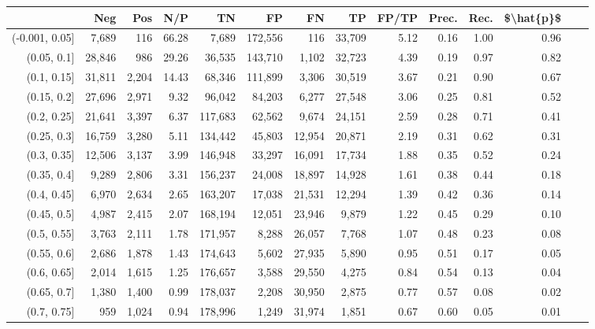 \begin{tabular}{rrrrrrrrrrrrrr}
\toprule
{} &     Neg &    Pos &    N/P &       TN &       FP &      FN &      TP & FP/TP & Prec. &  Rec. & \$\textbackslash hat\{p\}\$ \\
\midrule
(-0.001, 0.05] &   7,689 &    116 &  66.28 &    7,689 &  172,556 &     116 &  33,709 &  5.12 &  0.16 &  1.00 &      0.96 \\
(0.05, 0.1]    &  28,846 &    986 &  29.26 &   36,535 &  143,710 &   1,102 &  32,723 &  4.39 &  0.19 &  0.97 &      0.82 \\
(0.1, 0.15]    &  31,811 &  2,204 &  14.43 &   68,346 &  111,899 &   3,306 &  30,519 &  3.67 &  0.21 &  0.90 &      0.67 \\
(0.15, 0.2]    &  27,696 &  2,971 &   9.32 &   96,042 &   84,203 &   6,277 &  27,548 &  3.06 &  0.25 &  0.81 &      0.52 \\
(0.2, 0.25]    &  21,641 &  3,397 &   6.37 &  117,683 &   62,562 &   9,674 &  24,151 &  2.59 &  0.28 &  0.71 &      0.41 \\
(0.25, 0.3]    &  16,759 &  3,280 &   5.11 &  134,442 &   45,803 &  12,954 &  20,871 &  2.19 &  0.31 &  0.62 &      0.31 \\
(0.3, 0.35]    &  12,506 &  3,137 &   3.99 &  146,948 &   33,297 &  16,091 &  17,734 &  1.88 &  0.35 &  0.52 &      0.24 \\
(0.35, 0.4]    &   9,289 &  2,806 &   3.31 &  156,237 &   24,008 &  18,897 &  14,928 &  1.61 &  0.38 &  0.44 &      0.18 \\
(0.4, 0.45]    &   6,970 &  2,634 &   2.65 &  163,207 &   17,038 &  21,531 &  12,294 &  1.39 &  0.42 &  0.36 &      0.14 \\
(0.45, 0.5]    &   4,987 &  2,415 &   2.07 &  168,194 &   12,051 &  23,946 &   9,879 &  1.22 &  0.45 &  0.29 &      0.10 \\
(0.5, 0.55]    &   3,763 &  2,111 &   1.78 &  171,957 &    8,288 &  26,057 &   7,768 &  1.07 &  0.48 &  0.23 &      0.08 \\
(0.55, 0.6]    &   2,686 &  1,878 &   1.43 &  174,643 &    5,602 &  27,935 &   5,890 &  0.95 &  0.51 &  0.17 &      0.05 \\
(0.6, 0.65]    &   2,014 &  1,615 &   1.25 &  176,657 &    3,588 &  29,550 &   4,275 &  0.84 &  0.54 &  0.13 &      0.04 \\
(0.65, 0.7]    &   1,380 &  1,400 &   0.99 &  178,037 &    2,208 &  30,950 &   2,875 &  0.77 &  0.57 &  0.08 &      0.02 \\
(0.7, 0.75]    &     959 &  1,024 &   0.94 &  178,996 &    1,249 &  31,974 &   1,851 &  0.67 &  0.60 &  0.05 &      0.01 \\

\end{tabular}

